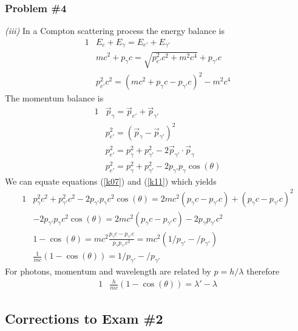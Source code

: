 \documentclass[]{article}
\numberwithin{equation}{subsection}
\begin{document}
\subsubsection*{Problem \#4}
\emph{(iii)} In a Compton scattering process the energy balance is
\begin{alignat}{1}
  \label{k05}            &E_{e}+E_{\gamma}=E_{e'}+E_{\gamma'}\\
  \label{k06}            &mc^{2}+p_{\gamma}c=\sqrt{p_{e'}^{2}c^{2}+m^{2}c^{4}}+p_{\gamma'}c\\
  \label{k07}            &p_{e'}^{2}c^{2}=(mc^{2}+p_{\gamma}c-p_{\gamma'}c)^{2}-m^{2}c^{4}
\end{alignat}
The momentum balance is
\begin{alignat}{1}
  \label{k08}            &\vec{p}_{\gamma}=\vec{p}_{e'}+\vec{p}_{\gamma'}\\
  \label{k09}            &p_{e'}^{2}=(\vec{p}_{\gamma}-\vec{p}_{\gamma'})^{2}\\
  \label{k10}            &p_{e'}^{2}=p_{\gamma}^{2}+p_{\gamma'}^{2}-2\vec{p}_{\gamma'}\cdot\vec{p}_{\gamma}\\
  \label{k11}            &p_{e'}^{2}=p_{\gamma}^{2}+p_{\gamma'}^{2}-2p_{\gamma'}p_{\gamma}\cos(\theta)
\end{alignat}
We can equate equations (\ref{k07}) and (\ref{k11}) which yields
\begin{alignat}{1}
  \label{k12}            &p_{\gamma}^{2}c^{2}+p_{\gamma'}^{2}c^{2}-2p_{\gamma'}p_{\gamma}c^{2}\cos(\theta)=2mc^{2}(p_{\gamma}c-p_{\gamma'}c)+(p_{\gamma}c-p_{\gamma'}c)^{2}\\
  \label{k13}            &-2p_{\gamma'}p_{\gamma}c^{2}\cos(\theta)=2mc^{2}(p_{\gamma}c-p_{\gamma'}c)-2p_{\gamma}p_{\gamma'}c^{2}\\
  \label{k14}            &1-\cos(\theta)=mc^{2}\frac{p_{\gamma}c-p_{\gamma'}c}{p_{\gamma}p_{\gamma'}c^{2}}=mc^{2}(1/p_{\gamma'}-/p_{\gamma'})\\
  \label{k15}            &\frac{1}{mc}(1-\cos(\theta))=1/p_{\gamma'}-/p_{\gamma'}
\end{alignat}
For photons, momentum and wavelength are related by $p=h/\lambda$ therefore
\begin{alignat}{1}
  \label{k16}            &\frac{h}{mc}(1-\cos(\theta))=\lambda'-\lambda
\end{alignat}
\subsection{Corrections to Exam \#2}
\end{document}
